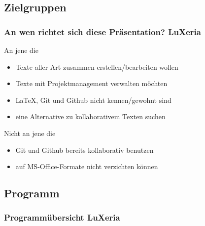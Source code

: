 \subsection{Zielgruppen}
\begin{frame}
	\frametitle{An wen richtet sich diese Präsentation? \hfill{} \footnotesize{LuXeria}}
	\begin{exampleblock}{An jene die}
		\begin{itemize}
			\item Texte aller Art zusammen erstellen/bearbeiten wollen
			\item Texte mit Projektmanagement verwalten möchten
			\item \LaTeX, Git und Github nicht kennen/gewohnt sind
			\item eine Alternative zu kollaborativem Texten suchen
		\end{itemize}
	\end{exampleblock}

	\begin{alertblock}{Nicht an jene die}
		\begin{itemize}
			\item Git und Github bereits kollaborativ benutzen
			\item auf MS-Office-Formate nicht verzichten können
		\end{itemize}
	\end{alertblock}
\end{frame}

\subsection{Programm}
\begin{frame}
\frametitle{Programmübersicht \hfill{} \footnotesize{LuXeria}}
	\tableofcontents[hideallsubsections]
\end{frame}
